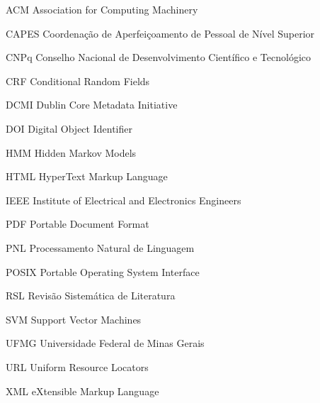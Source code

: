 
\begin{siglas}
  \item[ACM] Association for Computing Machinery
  \item[CAPES] Coordenação de Aperfeiçoamento de Pessoal de Nível Superior
  \item[CNPq] Conselho Nacional de Desenvolvimento Científico e Tecnológico
  \item[CRF] Conditional Random Fields
  \item[DCMI] Dublin Core Metadata Initiative
  \item[DOI] Digital Object Identifier
  \item[HMM] Hidden Markov Models
  \item[HTML] HyperText Markup Language
  \item[IEEE] Institute of Electrical and Electronics Engineers
  \item[PDF] Portable Document Format
  \item[PNL] Processamento Natural de Linguagem
  \item[POSIX] Portable Operating System Interface
  \item[RSL] Revisão Sistemática de Literatura
  \item[SVM] Support Vector Machines
  \item[UFMG] Universidade Federal de Minas Gerais
  \item[URL] Uniform Resource Locators
  \item[XML] eXtensible Markup Language
\end{siglas}